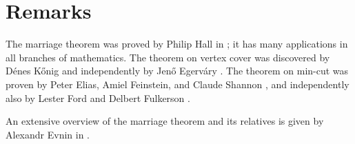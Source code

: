 \section*{Remarks}

The marriage theorem was proved by Philip Hall in \cite{hall};
it has many applications in all branches of mathematics.
The theorem on vertex cover was discovered by D\'enes K\H{o}nig \cite{konig} and independently by Jen\H{o} Egerv\'ary \cite{egervary}.
The theorem on min-cut was proven by Peter Elias, Amiel Feinstein, and Claude Shannon \cite{EFS}, 
and independently also by Lester Ford and Delbert Fulkerson \cite{ford-fulkerson}.

An extensive overview of the marriage theorem and its relatives is given by Alexandr Evnin in \cite{evnin}.
